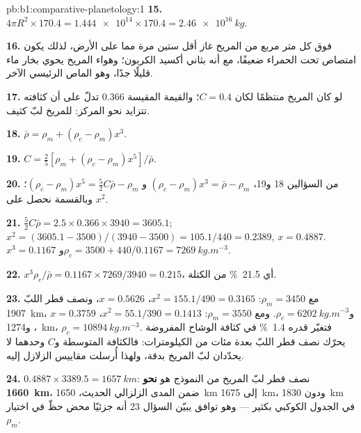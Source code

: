 \begin{solution}{pb:b1:comparative-planetology:1}
\textbf{15.} $4\pi R^2\times170.4 = \num{1.444e14}\times170.4 =
\qty{2.46e16}{kg}$.

\textbf{16.} فوق كل متر مربع من المريخ غاز أقل ستين مرة مما على الأرض، لذلك يكون امتصاص تحت الحمراء ضعيفًا، مع أنه بثاني أكسيد الكربون؛ وهواء المريخ يحوي بخار ماء قليلًا جدًا، وهو الماص الرئيسي الآخر.

\textbf{17.} لو كان المريخ منتظمًا لكان $C = 0.4$؛ والقيمة المقيسة 0.366 تدلّ على أن كثافته تتزايد نحو المركز: للمريخ لبّ كثيف.

\textbf{18.} $\bar\rho = \rho_m + (\rho_c - \rho_m)x^3$.

\textbf{19.} $C = \tfrac25[\rho_m + (\rho_c - \rho_m)x^5]/\bar\rho$.

\textbf{20.} من السؤالين 18 و19، $(\rho_c - \rho_m)x^3 = \bar\rho - \rho_m$ و
$(\rho_c - \rho_m)x^5 = \tfrac52C\bar\rho - \rho_m$؛ وبالقسمة نحصل على $x^2$.

\textbf{21.} $\tfrac52C\bar\rho = 2.5\times0.366\times3940 = 3605.1$;
$x^2 = (3605.1 - 3500)/(3940 - 3500) = 105.1/440 = 0.2389$, $x = 0.4887$.
$x^3 = 0.1167$ و$\rho_c = 3500 + 440/0.1167 = \qty{7269}{kg.m^{-3}}$.

\textbf{22.} $x^3\rho_c/\bar\rho = 0.1167\times7269/3940 = 0.215$، أي
\qty{21.5}{\percent} من الكتلة.

\textbf{23.} مع $\rho_m = 3450$: $x^2 = 155.1/490 = 0.3165$، $x = 0.5626$،
ونصف قطر اللبّ \qty{1907}{km}، و$\rho_c = \qty{6202}{kg.m^{-3}}$. ومع $\rho_m =
3550$: $x^2 = 55.1/390 = 0.1413$، $x = 0.3759$، و\qty{1274}{km}،
$\rho_c = \qty{10894}{kg.m^{-3}}$. فتغيّر قدره \qty{1.4}{\percent} في كثافة الوشاح المفروضة يحرّك نصف قطر اللبّ بعدة مئات من الكيلومترات: فالكثافة المتوسطة و$C$ وحدهما لا يحدّدان لبّ المريخ بدقة، ولهذا أُرسلت مقاييس الزلازل إليه.

\textbf{24.} $0.4887\times3389.5 = \qty{1657}{km}$: نصف قطر لبّ المريخ من النموذج هو \textbf{نحو \qty[text-series-to-math=true]{1660}{km}}، ضمن المدى الزلزالي الحديث، \qty{1650}{km} إلى \qty{1675}{km}، ودون \qty{1830}{km} في الجدول الكوكبي بكثير ---
وهو توافق يبيّن السؤال 23 أنه جزئيًا محض حظّ في اختيار $\rho_m$.
\end{solution}
